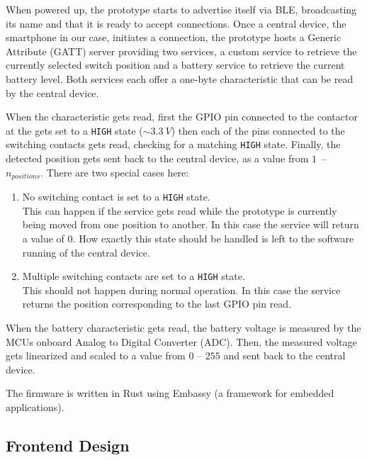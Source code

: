 \def\gpiohigh{\texttt{HIGH}\xspace}

When powered up, the prototype starts to advertise itself via BLE, broadcasting its name and that it is ready to accept connections.
Once a central device, the smartphone in our case, initiates a connection, the prototype hosts a Generic Attribute (GATT) server providing two services, a custom \likertshift service to retrieve the currently selected switch position and a battery service to retrieve the current battery level.
Both services each offer a one-byte characteristic that can be read by the central device.

When the \likertshift characteristic gets read, first the GPIO pin connected to the contactor at the \rotatorhead gets set to a \gpiohigh state ($\sim\SI{3.3}{V}$) then each of the pins connected to the switching contacts gets read, checking for a matching \gpiohigh state.
Finally, the detected position gets sent back to the central device, as a value from \mbox{$1$ -- $n_{positions}$}.
There are two special cases here:
\vspace*{-0.5em}
\begin{enumerate}[label=(\roman*),itemsep=0em]
    \item No switching contact is set to a \gpiohigh state.\\
        This can happen if the service gets read while the prototype is currently being moved from one position to another. In this case the service will return a value of $0$. How exactly this state should be handled is left to the software running of the central device.
    \item Multiple switching contacts are set to a \gpiohigh state.\\
        This should not happen during normal operation. In this case the service returns the position corresponding to the last GPIO pin read.
\end{enumerate}
\vspace*{-0.5em}
\noindent
When the battery characteristic gets read, the battery voltage is measured by the MCUs onboard Analog to Digital Converter (ADC).
Then, the measured voltage gets linearized and scaled to a value from $0$ -- $255$ and sent back to the central device.

\bigbreak\noindent
The firmware is written in Rust using Embassy (a framework for embedded applications).

\newpage
\subsection{Frontend Design}\label{subsec:frontend_design}

